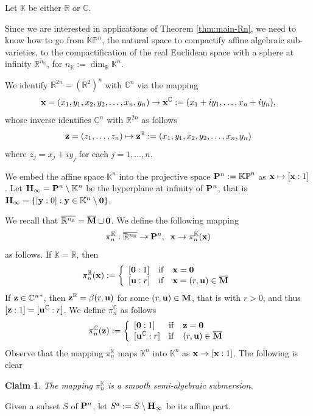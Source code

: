\documentclass[11pt]{amsart}
\newtheorem{claim}[theorem]{Claim}
\newcommand{\field}[1]{\mathbb{#1}}
\newcommand{\C}{\field{C}}
\newcommand{\K}{\field{K}}
\newcommand{\R}{\field{R}}
\newcommand{\bbo}{{\bf 0}}
\newcommand{\bH}{{\bf H}}
\newcommand{\bM}{{\bf M}}
\newcommand{\bMbar}{\overline{\bf M}}
\newcommand{\bP}{{\bf P}}
\newcommand{\bu}{{\bf u}}
\newcommand{\bx}{{\bf x}}
\newcommand{\by}{{\bf y}}
\newcommand{\bz}{{\bf z}}
\newcommand{\Cn}{{\C^n}}
\newcommand{\Kn}{{\K^n}}
\numberwithin{equation}{section}
\numberwithin{equation}{section}
\begin{document}
Let $\K$ be either $\R$ or $\C$. 

Since we are interested in applications of Theorem \ref{thm:main-Rn},
we need to know how to go from $\field{KP}^n$, the natural space to 
compactify affine algebraic sub-varieties, to the compactification of the 
real Euclidean space with a sphere at infinity $\overline{\R^{n_\K}}$,
for $n_\K := \dim_\R \Kn$.

\bigskip
We identify $\R^{2n} = (\R^2)^n$ with $\Cn$  via the mapping 
$$
\bx = (x_1,y_1,x_2,y_2,\ldots,x_n,y_n) \to \bx^\C := 
(x_1+i y_1, \ldots,x_n+iy_n),
$$
whose inverse identifies $\Cn$ with $\R^{2n}$ as 
follows
$$
\bz = (z_1,\ldots,z_n) \mapsto \bz^\R := (x_1,y_1,x_2,y_2,\ldots,x_n,y_n)
$$
where $z_j = x_j + iy_j$ for each $j=1,\ldots,n$.

\bigskip
We embed the affine space $\K^n$ into the projective space 
$\bP^n := \mathbb{KP}^n$ as $\bx \mapsto [\bx:1]$. Let $\bH_\infty = \bP^n 
\setminus \K^n$ be the hyperplane at infinity of $\bP^n$, that is 
$\bH_\infty = \{[\by:0] :\by \in \K^n\setminus \bbo\}$.

\bigskip
We recall that $\overline{\R^{n_\K}} = \bMbar \sqcup \bbo$.  
We define the following mapping
$$
\pi_n^\K :\overline{\R^{n_\K}} \to \bP^n,\;\; \bx \to \pi_n^\K(\bx)
$$
as follows. If $\K = \R$, then
$$ 
\pi_n^\R(\bx) := 
\left\{
\begin{array}{lcl}
[\bbo:1] & {\rm if} & \bx = \bbo \\
{[\bu:r]} & {\rm if} & \bx = (r,\bu) \in \bMbar \\
\end{array}
\right.
$$
If $\bz\in\Cn^*$, then $\bz^\R = \beta(r,\bu)$ for some $(r,\bu) \in \bM$, 
that is with $r>0$, and thus $[\bz:1] = [\bu^\C:r]$. We define $\pi_n^\C$
as follows 
$$ 
\pi_n^\C(\bz) := 
\left\{
\begin{array}{lcl}
[\bbo:1] & {\rm if} & \bz = \bbo \\
{[\bu^\C:r]} & {\rm if} & (r,\bu) \in \bMbar \\
\end{array}
\right.
$$
%
%
Observe that the mapping $\pi_n^\K$ maps $\K^n$ into $\Kn$ as
$\bx \to [\bx:1]$. 
The following is clear
%
%
\begin{claim}\label{claim:projection-submersion}
The mapping $\pi_n^\K$ is a smooth semi-algebraic submersion.
\end{claim}
%
%
Given a subset $S$ of $\bP^n$, let $S^a := S \setminus \bH_\infty$ be its 
affine part.
\end{document}
